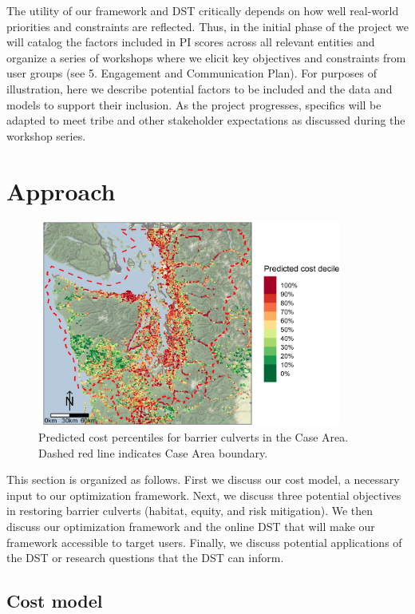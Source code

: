 The utility of our framework and DST critically depends on how well real-world priorities and constraints are reflected. Thus, in the initial phase of the project we will catalog the factors included in PI scores across all relevant entities and organize a series of workshops where we elicit key objectives and constraints from user groups (see 5. Engagement and Communication Plan). For purposes of illustration, here we describe potential factors to be included and the data and models to support their inclusion. As the project progresses, specifics will be adapted to meet tribe and other stakeholder expectations as discussed during the workshop series.  

%
\section{Approach}

\begin{figure}
	\centering
	\includegraphics[width=10cm]{figures/predCost.png}
	\caption{Predicted cost percentiles for barrier culverts in the Case Area. Dashed red line indicates Case Area boundary.\label{fig:cost}}
\end{figure}%


This section is organized as follows. First we discuss our cost model, a necessary input to our optimization framework. Next, we discuss three potential objectives in restoring barrier culverts (habitat, equity, and risk mitigation). We then discuss our optimization framework and the online DST that will make our framework accessible to target users. Finally, we discuss potential applications of the DST or research questions that the DST can inform.

\subsection*{Cost model \label{sec:cost}}


